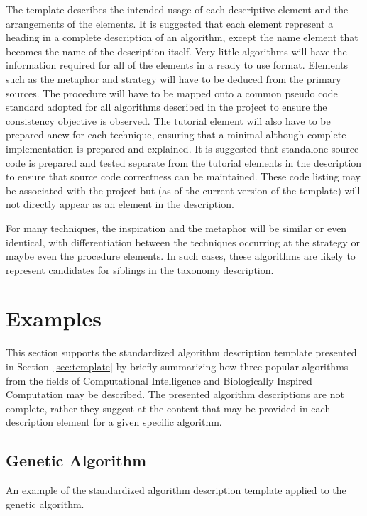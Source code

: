 \documentclass[a4paper, 11pt]{article}
\begin{document}
The template describes the intended usage of each descriptive element and the arrangements of the elements. It is suggested that each element represent a heading in a complete description of an algorithm, except the name element that becomes the name of the description itself. 
Very little algorithms will have the information required for all of the elements in a ready to use format. Elements such as the metaphor and strategy will have to be deduced from the primary sources. The procedure will have to be mapped onto a common pseudo code standard adopted for all algorithms described in the project to ensure the consistency objective is observed. The tutorial element will also have to be prepared anew for each technique, ensuring that a minimal although complete implementation is prepared and explained. 
It is suggested that standalone source code is prepared and tested separate from the tutorial elements in the description to ensure that source code correctness can be maintained. These code listing may be associated with the project but (as of the current version of the template) will not directly appear as an element in the description.  

For many techniques, the inspiration and the metaphor will be similar or even identical, with differentiation between the techniques occurring at the strategy or maybe even the procedure elements. In such cases, these algorithms are likely to represent candidates for siblings in the taxonomy description.

\section{Examples} 
\label{sec:examples}
This section supports the standardized algorithm description template presented in Section~\ref{sec:template} by briefly summarizing how three popular algorithms from the fields of Computational Intelligence and Biologically Inspired Computation may be described. The presented algorithm descriptions are not complete, rather they suggest at the content that may be provided in each description element for a given specific algorithm. 

\subsection{Genetic Algorithm}
An example of the standardized algorithm description template applied to the genetic algorithm.
\end{document}
